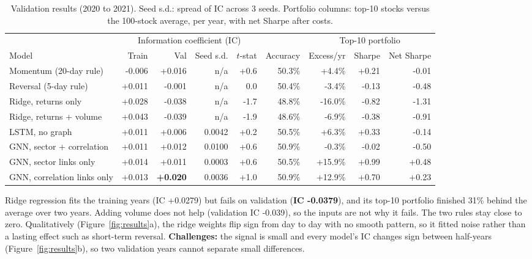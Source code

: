 \documentclass[final]{article}
\begin{document}
\begin{table}[!ht]
  \centering
  \caption{Validation results (2020 to 2021). Seed s.d.: spread of IC across 3 seeds. Portfolio columns: top-10 stocks versus the 100-stock average, per year, with net Sharpe after costs.}
  \label{tab:results}
  \footnotesize
  \setlength{\tabcolsep}{2.9pt}
  \begin{tabular}{lrrrrrrrr}
\toprule
 & \multicolumn{4}{c}{Information coefficient (IC)} & & \multicolumn{3}{c}{Top-10 portfolio} \\
\cmidrule(lr){2-5}\cmidrule(lr){7-9}
Model & Train & Val & Seed s.d. & $t$-stat & Accuracy & Excess/yr & Sharpe & Net Sharpe \\
\midrule
Momentum (20-day rule) & -0.006 & +0.016 & n/a & +0.6 & 50.3\% & +4.4\% & +0.21 & -0.01 \\
Reversal (5-day rule) & +0.011 & -0.001 & n/a & 0.0 & 50.4\% & -3.4\% & -0.13 & -0.48 \\
Ridge, returns only & +0.028 & -0.038 & n/a & -1.7 & 48.8\% & -16.0\% & -0.82 & -1.31 \\
Ridge, returns + volume & +0.043 & -0.039 & n/a & -1.9 & 48.6\% & -6.9\% & -0.38 & -0.91 \\
\midrule
LSTM, no graph & +0.011 & +0.006 & 0.0042 & +0.2 & 50.5\% & +6.3\% & +0.33 & -0.14 \\
GNN, sector + correlation & +0.011 & +0.012 & 0.0100 & +0.6 & 50.9\% & -0.3\% & -0.02 & -0.50 \\
\midrule
GNN, sector links only & +0.014 & +0.011 & 0.0003 & +0.6 & 50.5\% & +15.9\% & +0.99 & +0.48 \\
GNN, correlation links only & +0.013 & \textbf{+0.020} & 0.0036 & +1.0 & 50.9\% & +12.9\% & +0.70 & +0.23 \\
\bottomrule
\end{tabular}
\end{table}

Ridge regression fits the training years (IC +0.0279) but fails on validation (\textbf{IC -0.0379}), and its top-10 portfolio finished 31\% behind the average over two years. Adding volume does not help (validation IC -0.039), so the inputs are not why it fails. The two rules stay close to zero. Qualitatively (Figure~\ref{fig:results}a), the ridge weights flip sign from day to day with no smooth pattern, so it fitted noise rather than a lasting effect such as short-term reversal. \textbf{Challenges:} the signal is small and every model's IC changes sign between half-years (Figure~\ref{fig:results}b), so two validation years cannot separate small differences.
\end{document}
